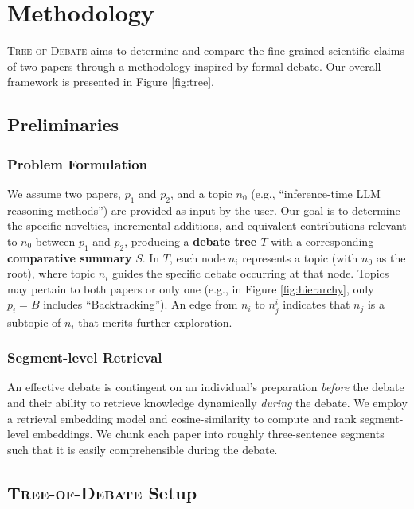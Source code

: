\section{Methodology}

\textsc{Tree-of-Debate} aims to determine and compare the fine-grained scientific claims of two papers through a methodology inspired by formal debate. Our overall framework is presented in Figure \ref{fig:tree}.
\subsection{Preliminaries}

\subsubsection{\textbf{Problem Formulation}} 
We assume two papers, $p_1$ and $p_2$, and a topic $n_0$ (e.g., ``inference-time LLM reasoning methods'') are provided as input by the user. Our goal is to determine the specific novelties, incremental additions, and equivalent contributions relevant to $n_0$ between $p_1$ and $p_2$, producing a \textbf{debate tree $T$} with a corresponding \textbf{comparative summary} $S$. In $T$, each node $n_i$ represents a topic (with $n_0$ as the root), where topic $n_i$ guides the specific debate occurring at that node. Topics may pertain to both papers or only one (e.g., in Figure \ref{fig:hierarchy}, only $p_i=B$ includes ``Backtracking''). An edge from $n_i$ to $n^i_j$ indicates that $n_j$ is a subtopic of $n_i$ that merits further exploration.

\subsubsection{\textbf{Segment-level Retrieval}}
\label{sec:retrieval}
An effective debate is contingent on an individual's preparation \textit{before} the debate and their ability to retrieve knowledge dynamically \textit{during} the debate. We employ a retrieval embedding model \cite{bge_embedding} and cosine-similarity to compute and rank segment-level embeddings. We chunk each paper into roughly three-sentence segments such that it is easily comprehensible during the debate.

\subsection{\textsc{Tree-of-Debate} Setup}

